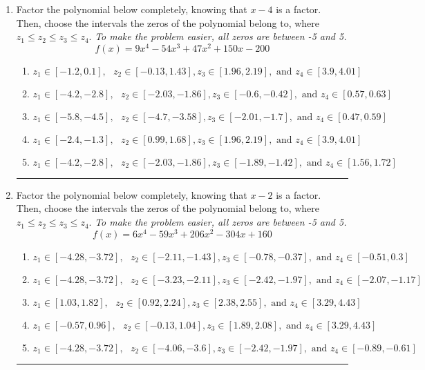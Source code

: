 \documentclass[14pt]{extbook}
\newcommand{\litem}[1]{\item#1\hspace*{-1cm}\rule{\textwidth}{0.4pt}}
\begin{document}
\begin{enumerate}
{\begin{enumerate}[label=\Alph*.]
\end{enumerate} }
\litem{
Factor the polynomial below completely, knowing that $x -4$ is a factor. Then, choose the intervals the zeros of the polynomial belong to, where $z_1 \leq z_2 \leq z_3 \leq z_4$. \textit{To make the problem easier, all zeros are between -5 and 5.}\[ f(x) = 9x^{4} -54 x^{3} +47 x^{2} +150 x -200 \]\begin{enumerate}[label=\Alph*.]
\item \( z_1 \in [-1.2, 0.1], \text{   }  z_2 \in [-0.13, 1.43], z_3 \in [1.96, 2.19], \text{   and   } z_4 \in [3.9, 4.01] \)
\item \( z_1 \in [-4.2, -2.8], \text{   }  z_2 \in [-2.03, -1.86], z_3 \in [-0.6, -0.42], \text{   and   } z_4 \in [0.57, 0.63] \)
\item \( z_1 \in [-5.8, -4.5], \text{   }  z_2 \in [-4.7, -3.58], z_3 \in [-2.01, -1.7], \text{   and   } z_4 \in [0.47, 0.59] \)
\item \( z_1 \in [-2.4, -1.3], \text{   }  z_2 \in [0.99, 1.68], z_3 \in [1.96, 2.19], \text{   and   } z_4 \in [3.9, 4.01] \)
\item \( z_1 \in [-4.2, -2.8], \text{   }  z_2 \in [-2.03, -1.86], z_3 \in [-1.89, -1.42], \text{   and   } z_4 \in [1.56, 1.72] \)

\end{enumerate} }
\litem{
Factor the polynomial below completely, knowing that $x -2$ is a factor. Then, choose the intervals the zeros of the polynomial belong to, where $z_1 \leq z_2 \leq z_3 \leq z_4$. \textit{To make the problem easier, all zeros are between -5 and 5.}\[ f(x) = 6x^{4} -59 x^{3} +206 x^{2} -304 x + 160 \]\begin{enumerate}[label=\Alph*.]
\item \( z_1 \in [-4.28, -3.72], \text{   }  z_2 \in [-2.11, -1.43], z_3 \in [-0.78, -0.37], \text{   and   } z_4 \in [-0.51, 0.3] \)
\item \( z_1 \in [-4.28, -3.72], \text{   }  z_2 \in [-3.23, -2.11], z_3 \in [-2.42, -1.97], \text{   and   } z_4 \in [-2.07, -1.17] \)
\item \( z_1 \in [1.03, 1.82], \text{   }  z_2 \in [0.92, 2.24], z_3 \in [2.38, 2.55], \text{   and   } z_4 \in [3.29, 4.43] \)
\item \( z_1 \in [-0.57, 0.96], \text{   }  z_2 \in [-0.13, 1.04], z_3 \in [1.89, 2.08], \text{   and   } z_4 \in [3.29, 4.43] \)
\item \( z_1 \in [-4.28, -3.72], \text{   }  z_2 \in [-4.06, -3.6], z_3 \in [-2.42, -1.97], \text{   and   } z_4 \in [-0.89, -0.61] \)


\end{enumerate}}
\end{enumerate}
\end{document}
